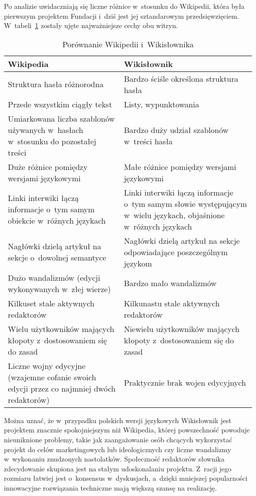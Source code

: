 Po analizie uwidaczniają się liczne różnice w~stosunku do Wikipedii, która była pierwszym projektem Fundacji i~dziś jest jej sztandarowym przedsięwzięciem. W~tabeli~\ref{tab:wiki-wikt} zostały ujęte najważniejsze cechy obu witryn.
\begin{table}[h]
\begin{center}
	\begin{tabularx}{\textwidth}{ XX }
		\toprule \textbf{Wikipedia} & \textbf{Wikisłownik} \\
		\toprule Struktura hasła różnorodna
			& Bardzo ściśle określona struktura hasła \\
		\midrule Przede wszystkim ciągły tekst
			& Listy, wypunktowania \\
		\midrule Umiarkowana liczba szablonów używanych w~hasłach w~stosunku do pozostałej treści
			& Bardzo duży udział szablonów w~treści hasła \\
		\midrule Duże różnice pomiędzy wersjami językowymi
			& Małe różnice pomiędzy wersjami językowymi \\
		\midrule Linki interwiki łączą informacje o~tym samym obiekcie w~różnych językach
			& Linki interwiki łączą informacje o~tym samym słowie występującym w~wielu językach, objaśnione w~różnych językach \\
		\midrule Nagłówki dzielą artykuł na sekcje o~dowolnej semantyce
			& Nagłówki dzielą artykuł na sekcje odpowiadające poszczególnym językom \\
		\midrule Dużo wandalizmów (edycji wykonywanych w~złej wierze)
			& Bardzo mało wandalizmów \\
		\midrule Kilkuset stale aktywnych redaktorów
			& Kilkunastu stale aktywnych redaktorów \\
		\midrule Wielu użytkowników mających kłopoty z~dostosowaniem się do zasad
			& Niewielu użytkowników mających kłopoty z~dostosowaniem się do zasad \\
		\midrule Liczne wojny edycyjne (wzajemne cofanie swoich edycji przez co najmniej dwóch redaktorów)
			& Praktycznie brak wojen edycyjnych \\
		\bottomrule
	\end{tabularx}
\caption{Porównanie Wikipedii i~Wikisłownika}
\label{tab:wiki-wikt}
\end{center}
\end{table}

Można uznać, że w~przypadku polskich wersji językowych Wikisłownik jest projektem znacznie spokojniejszym niż Wikipedia, której powszechność powoduje nieuniknione problemy, takie jak zaangażowanie osób chcących wykorzystać projekt do celów marketingowych lub ideologicznych czy liczne wandalizmy w~wykonaniu znudzonych nastolatków. Społeczność redaktorów słownika zdecydowanie skupiona jest na stałym udoskonalaniu projektu. Z~racji jego rozmiaru łatwiej jest o~konsensus w~dyskusjach, a~dzięki mniejszej popularności innowacyjne rozwiązania techniczne mają większą szansę na realizację.

